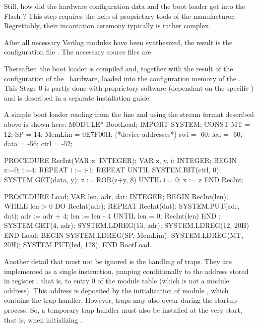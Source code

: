 Still, how did the hardware configuration data and the boot loader get into the Flash ? This step requires the help of proprietary tools of the  manufacturer. Regrettably, their incantation ceremony typically is rather complex.

After all necessary Verilog modules have been synthesized, the result is the configuration file . The necessary source files are


Thereafter, the boot loader is compiled and, together with the result of the configuration of the \RISC\ hardware, loaded into the configuration memory of the . This Stage 0 is partly done with proprietory software (dependant on the specific ) and is described in a separate installation guide.


A simple boot loader reading from the  line and using the stream format described above is shown here:
\begintt
MODULE* BootLoad;
  IMPORT SYSTEM;
  CONST MT = 12; SP = 14; MemLim = 0E7F00H;
    (*device addresses*)
    swi = -60; led = -60; data = -56; ctrl = -52; 
    
  PROCEDURE RecInt(VAR x: INTEGER);
    VAR z, y, i: INTEGER;
  BEGIN
    z:=0; i:=4; REPEAT i := i-1;
    REPEAT UNTIL SYSTEM.BIT(ctrl, 0);
      SYSTEM.GET(data, y); z := ROR(z+y, 8)
    UNTIL i = 0;
    x := z
  END RecInt;
  
  PROCEDURE Load;
    VAR len, adr, dat: INTEGER;
  BEGIN RecInt(len);
    WHILE len > 0 DO
      RecInt(adr);
      REPEAT RecInt(dat);
        SYSTEM.PUT(adr, dat);
        adr := adr + 4;
        len := len - 4
      UNTIL len = 0;
      RecInt(len)
    END ;
    SYSTEM.GET(4, adr);
    SYSTEM.LDREG(13, adr);
    SYSTEM.LDREG(12, 20H)
  END Load;
BEGIN
  SYSTEM.LDREG(SP, MemLim);
  SYSTEM.LDREG(MT, 20H);
  SYSTEM.PUT(led, 128);
END BootLoad.
\endtt

\noindent Another detail that must not be ignored is the handling of traps. They are implemented as a single  instruction, jumping conditionally to the address stored in register , that is, to entry 0 of the module table (which is not a module address). This address is deposited by the initialization of module , which contains the trap handler. However, traps may also occur during the startup process. So, a temporary trap handler must also be installed at the very start, that is, when initializing .

